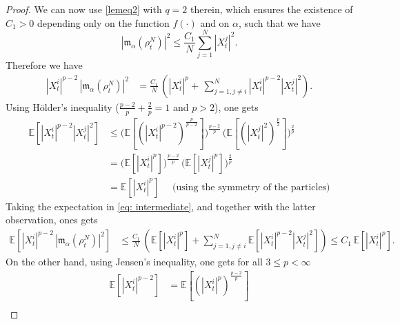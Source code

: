 \documentclass[10pt,a4paper]{amsart}
\begin{document}
\begin{proof}
We can now use \eqref{lemeq2} with $q=2$ therein, which ensures the existence of $C_{1}>0$ depending only on the function $f(\cdot)$ and on $\alpha$, such that we have
\begin{equation*}
    |\mathfrak{m}_{\alpha}(\rho^{N}_{t})|^{2} \leq \frac{C_{1}}{N}\sum\limits_{j=1}^{N}|X^{j}_{t}|^{2}.
\end{equation*}
Therefore we have
\begin{equation}\label{eq: intermediate}
    \begin{aligned}
        |X^{i}_{t}|^{p-2} \,|\mathfrak{m}_{\alpha}(\rho^{N}_{t})|^{2} 
        & =  \frac{C_{1}}{N} \, \left(|X^{i}_{t}|^{p}+ \, \sum\limits_{j=1,j\neq i}^{N}|X^{i}_{t}|^{p-2}|X^{j}_{t}|^{2} \right).
    \end{aligned}
\end{equation}
Using H\"older's inequality ($\frac{p-2}{p} + \frac{2}{p} =1$ and $p>2$), one gets
\begin{equation*}
    \begin{aligned}
        \mathbb{E}\left[|X^{i}_{t}|^{p-2}|X^{j}_{t}|^{2}\right] & \leq \bigg(\mathbb{E}\left[(|X^{i}_{t}|^{p-2})^{\frac{p}{p-2}}\right]\bigg)^{\frac{p-2}{p}}\, \bigg(\mathbb{E}\left[(|X^{j}_{t}|^{2})^{\frac{p}{2}}\right]\bigg)^{\frac{2}{p}}\\
        & = \bigg(\mathbb{E}\left[|X^{i}_{t}|^{p}\right]\bigg)^{\frac{p-2}{p}}\, \bigg(\mathbb{E}\left[|X^{j}_{t}|^{p}\right]\bigg)^{\frac{2}{p}}\\
        & = \mathbb{E}\left[|X^{i}_{t}|^{p}\right] \quad \text{ (using the symmetry of the particles)}
    \end{aligned}
\end{equation*}
Taking the expectation in \eqref{eq: intermediate}, and together with the latter observation, ones gets
\begin{equation*}
    \begin{aligned}
        \mathbb{E}\left[|X^{i}_{t}|^{p-2} \,|\mathfrak{m}_{\alpha}(\rho^{N}_{t})|^{2}\right] 
        & \leq \frac{C_{1}}{N} \, \left(\mathbb{E}\left[|X^{i}_{t}|^{p}\right] + \sum\limits_{j=1,j\neq i}^{N} \mathbb{E}\left[|X^{i}_{t}|^{p-2}|X^{j}_{t}|^{2}\right] \right)  \leq C_{1}\, \mathbb{E}\left[|X^{i}_{t}|^{p}\right]. 
    \end{aligned}
\end{equation*}
On the other hand, using  Jensen's inequality, one gets for all $ 3\leq p<\infty $
\begin{align*}
    \mathbb{E}[|X^{i}_{t}|^{p-2}] & = \mathbb{E}\left[(|X^{i}_{t}|^{p})^{\frac{p-2}{p}}\right] \\

\end{align*}
\end{proof}
\end{document}

